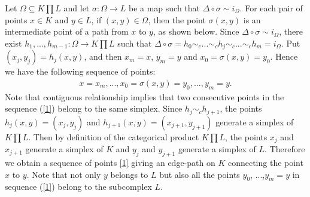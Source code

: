 \documentclass[preprint,11pt %
]{hjm1}
\theoremstyle{definition}
\begin{document}
Let $\Omega \subseteq K\prod  L$ and let $\sigma :\Omega \to L$ be a map such that $\Delta \circ \sigma \sim i_\Omega $. For each pair of points $x\in K$ and $y\in L$, if  $(x,y)\in \Omega $, then the point $\sigma (x,y)$ is an intermediate point of a path from $x$ to $y$, as shown below.
Since $\Delta \circ \sigma \sim i_\Omega $, there exist $h_1,...,h_{m-1}:\Omega \to K\prod  L$ such that $\Delta \circ \sigma =h_0\sim _c ...\sim _c h_j \sim _c ... \sim _c h_m=i_\Omega $. Put $(x_j,y_j)=h_j(x,y)$, and then $x_m=x$, $y_m=y$ and $x_0=\sigma (x,y)=y_0$. Hence we have the following sequence of points:
\begin{align}\label{1}
x=x_m,...,x_0=\sigma (x,y)=y_0,...,y_m=y.
\end{align}
Note that contiguous relationship implies that two consecutive points in the sequence
(\ref{1}) 
belong to the same simplex. Since $h_j \sim _ch_{j+1}$, the points $h_j(x,y)=(x_j,y_j)$ and $h_{j+1}(x,y)=(x_{j+1},y_{j+1})$ generate a simplex of $K\prod  L$.
Then by definition of the categorical product $K\prod  L$, the points $x_j$ and $x_{j+1}$ generate a simplex of $K$ and  $y_j$ and $y_{j+1}$ generate a simplex of $L$. Therefore we obtain a sequence of points \eqref{1} giving an edge-path on $K$ connecting the point $x$ to $y$.
Note that not only $y$ belongs to $L$ but also all the points $y_0$, ...,$y_m=y$ in sequence (\ref{1}) belong to the subcomplex $L$. 
\end{document}
